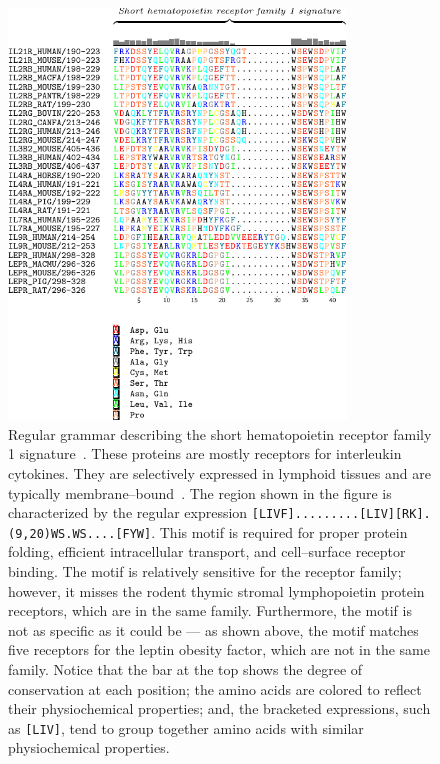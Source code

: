             \begin{figure}[ptb]
            \centering
            \includegraphics[width=0.80\textwidth]{Body/Images-chap1/hematopo.pdf}
            \caption[Regular grammar describing the short hematopoietin receptor family 1 signature]{
            Regular grammar describing the short hematopoietin receptor family 1 signature~\cite{hofmann1999prosite}.
            These proteins are mostly receptors for interleukin
            cytokines.  They are selectively expressed in lymphoid
            tissues and are typically membrane--bound~\cite{parrish-novak2000interleukin}.  The
            region shown in the figure is characterized by the
            regular expression
            \texttt{[LIVF].........[LIV][RK].(9,20)WS.WS....[FYW]}.
            This motif is required for
            proper protein folding, efficient intracellular transport, and cell--surface receptor
            binding.  The motif is relatively sensitive for the
            receptor family; however, it misses the rodent thymic stromal lymphopoietin protein
            receptors, which are in the same family.  Furthermore,
            the motif is not as specific as it could be --- as shown
            above, the motif matches five receptors for the leptin
            obesity factor, which are not in the same family.
            Notice that the bar at the top shows the degree of
            conservation at each position; the amino acids are
            colored to reflect their physiochemical properties; and,
            the bracketed expressions, such as \texttt{[LIV]}, tend
            to group together amino acids with similar physiochemical properties.
            }
            \label{fig:hemato}
            \end{figure}

